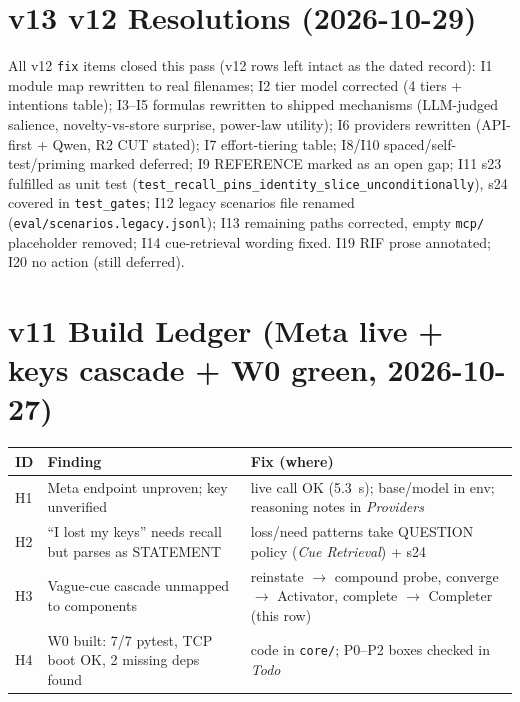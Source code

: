 \section{v13 v12 Resolutions (2026-10-29)}
All v12 \texttt{fix} items closed this pass (v12 rows left intact as the dated
record): I1 module map rewritten to real filenames; I2 tier model corrected
(4 tiers + intentions table); I3--I5 formulas rewritten to shipped mechanisms
(LLM-judged salience, novelty-vs-store surprise, power-law utility); I6
providers rewritten (API-first + Qwen, R2 CUT stated); I7 effort-tiering
table; I8/I10 spaced/self-test/priming marked deferred; I9 REFERENCE marked
as an open gap; I11 s23 fulfilled as unit test
(\texttt{test\_recall\_pins\_identity\_slice\_unconditionally}), s24 covered
in \texttt{test\_gates}; I12 legacy scenarios file renamed
(\texttt{eval/scenarios.legacy.jsonl}); I13 remaining paths corrected,
empty \texttt{mcp/} placeholder removed; I14 cue-retrieval wording fixed.
I19 RIF prose annotated; I20 no action (still deferred).

\section{v11 Build Ledger (Meta live + keys cascade + W0 green, 2026-10-27)}
\begin{longtable}{@{}p{}p{}p{}@{}}
\toprule
ID & Finding & Fix (where) \\
\midrule
H1 & Meta endpoint unproven; key unverified & live call OK (5.3~s); base/model in env; reasoning notes in \emph{Providers} \\
H2 & ``I lost my keys'' needs recall but parses as STATEMENT & loss/need patterns take QUESTION policy (\emph{Cue Retrieval}) + s24 \\
H3 & Vague-cue cascade unmapped to components & reinstate $\rightarrow$ compound probe, converge $\rightarrow$ Activator, complete $\rightarrow$ Completer (this row) \\
H4 & W0 built: 7/7 pytest, TCP boot OK, 2 missing deps found & code in \texttt{core/}; P0--P2 boxes checked in \emph{Todo} \\
\bottomrule
\end{longtable}
